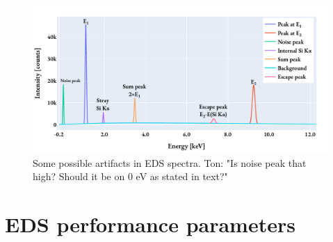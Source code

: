 \begin{figure}[htbp]
    \centering
    \includegraphics[width=0.95\linewidth]{figures/eds_artifacts.pdf}
    \caption{
        Some possible artifacts in EDS spectra.
        Ton: "Is noise peak that high? Should it be on $0$ eV as stated in text?"
    }
    \label{fig:eds_artifacts}
\end{figure}





\clearpage








































\section{EDS performance parameters}
\label{theory:eds_performance}




